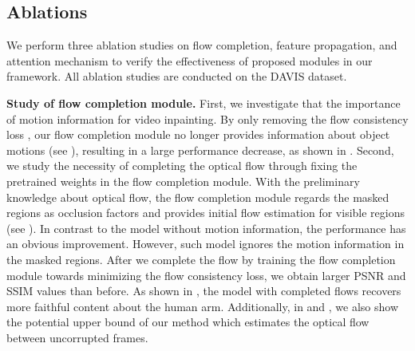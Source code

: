 \documentclass[final]{cvpr}
\newcommand{\subtitle}[1]{\noindent \textbf{#1}}
\begin{document}
\begin{table}
    \begin{center}
        \caption{\label{tab:flow-ablation}
            Ablation studies on the flow completion module.}
        \renewcommand{\arraystretch}{1.2}
        \renewcommand{\tabcolsep}{5mm}
        \vspace{-7mm}
    \end{center}
\end{table}

\subsection{Ablations}
We perform three ablation studies on flow completion, feature propagation, and attention mechanism to verify the effectiveness of proposed modules in our framework.
All ablation studies are conducted on the DAVIS dataset.

\subtitle{Study of flow completion module.}
First, we investigate that the importance of motion information for video inpainting.
By only removing the flow consistency loss , our flow completion module no longer provides information about object motions (see ), resulting in a large performance decrease, as shown in .
Second, we study the necessity of completing the optical flow through fixing the pretrained weights in the flow completion module.
With the preliminary knowledge about optical flow, the flow completion module regards the masked regions as occlusion factors and provides initial flow estimation for visible regions (see ).
In contrast to the model without motion information, the performance has an obvious improvement.
However, such model ignores the motion information in the masked regions.
After we complete the flow by training the flow completion module towards minimizing the flow consistency loss, we obtain larger PSNR and SSIM values than before.
As shown in , the model with completed flows recovers more faithful content about the human arm.
Additionally, in  and , we also show the potential upper bound of our method which estimates the optical flow between uncorrupted frames.
\end{document}
